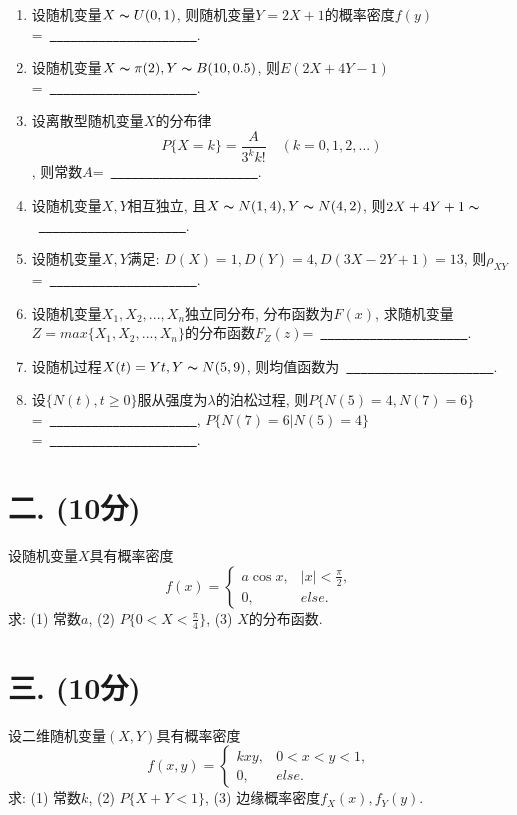 \documentclass[a4paper,11pt]{article}
\newcommand{\blank}{\uline{\textcolor{white}{a}\ \textcolor{white}{a}\ \textcolor{white}{a}\ \textcolor{white}{a}\ \textcolor{white}{a}\ \textcolor{white}{a}\ \textcolor{white}{a}\ \textcolor{white}{a}\ \textcolor{white}{a}\ \textcolor{white}{a}\ \textcolor{white}{a}}}
\begin{document}
\begin{CJK}{GBK}{song}
\begin{enumerate}
\item 设随机变量$X \thicksim U(0,1)$, 则随机变量$Y=2X+1$的概率密度$f(y)$=~\blank.

\item 设随机变量$X \thicksim \pi(2), Y \thicksim B(10,0.5)$, 则$E(2X+4Y-1)$=~\blank.

\item 设离散型随机变量$X$的分布律
\begin{displaymath}
P\{X=k\}=\frac{A}{3^k k!}\quad (k=0,1,2,...)
\end{displaymath}
, 则常数$A$=~\blank.

\item 设随机变量$X,Y$相互独立, 且$X \thicksim N(1,4), Y\thicksim N(4,2)$, 则$2X+4Y+1 \thicksim$~\blank.

\item 设随机变量$X,Y$满足: $D(X)=1, D(Y)=4, D(3X-2Y+1)=13$, 则$\rho_{XY}$=~\blank.

\item 设随机变量$X_1,X_2,...,X_n$独立同分布, 分布函数为$F(x)$, 求随机变量$Z=max\{X_1,X_2,...,X_n\}$的分布函数$F_Z(z)$=~\blank.

\item 设随机过程$X(t)=Yt, Y \thicksim N(5,9)$, 则均值函数为~\blank.

\item 设$\{N(t),t\ge 0\}$服从强度为$\lambda$的泊松过程, 则$P\{N(5)=4,N(7)=6\}$=~\blank, $P\{N(7)=6 | N(5)=4\}$=~\blank.

\end{enumerate}

\newpage

\section*{二. (10分)}

设随机变量$X$具有概率密度
\[
f(x)=
    \left\{
        \begin{array}{ll}
            a\cos x,   &\textrm{$\displaystyle{ |x|<\frac{\pi}{2}, }$} \\
            0,      &\textrm{$else$.}
        \end{array}
    \right.
\]
求: (1) 常数$a$, (2) $\displaystyle{ P\{0<X<\frac{\pi}{4}\} }$, (3) $X$的分布函数.

\section*{三. (10分)}

设二维随机变量$(X,Y)$具有概率密度
\[
f(x,y)=
    \left\{
        \begin{array}{ll}
            kxy,    &\textrm{$0<x<y<1,$} \\
            0,      &\textrm{$else$.}
        \end{array}
    \right.
\]
求: (1) 常数$k$, (2) $P\{X+Y<1\}$, (3) 边缘概率密度$f_X(x), f_Y(y)$.


\end{CJK}
\end{document}
